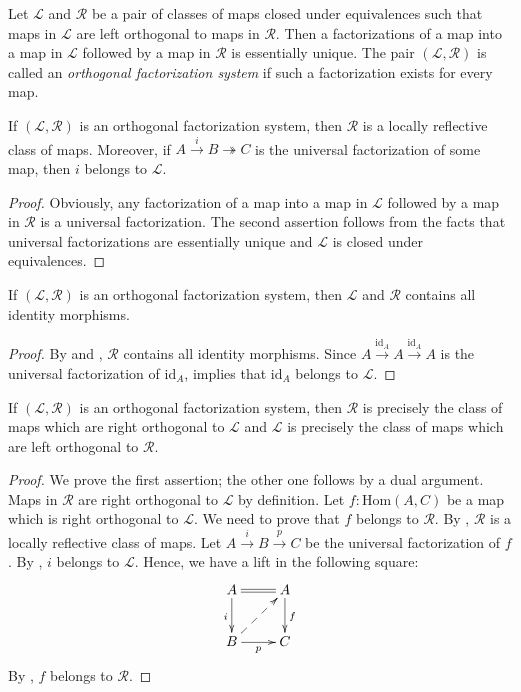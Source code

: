\documentclass[reqno]{amsart}
\theoremstyle{definition}
\theoremstyle{remark}
\newcommand{\fs}[1]{\mathrm{#1}}
\newcommand{\Hom}{\fs{Hom}}
\newcommand{\id}{\fs{id}}
\numberwithin{figure}{section}
\begin{document}
Let $\mathcal{L}$ and $\mathcal{R}$ be a pair of classes of maps closed under equivalences such that maps in $\mathcal{L}$ are left orthogonal to maps in $\mathcal{R}$.
Then a factorizations of a map into a map in $\mathcal{L}$ followed by a map in $\mathcal{R}$ is essentially unique.
The pair $(\mathcal{L},\mathcal{R})$ is called an \emph{orthogonal factorization system} if such a factorization exists for every map.

\begin{lem}
If $(\mathcal{L},\mathcal{R})$ is an orthogonal factorization system, then $\mathcal{R}$ is a locally reflective class of maps.
Moreover, if $A \xrightarrow{i} B \twoheadrightarrow C$ is the universal factorization of some map, then $i$ belongs to $\mathcal{L}$.
\end{lem}
\begin{proof}
Obviously, any factorization of a map into a map in $\mathcal{L}$ followed by a map in $\mathcal{R}$ is a universal factorization.
The second assertion follows from the facts that universal factorizations are essentially unique and $\mathcal{L}$ is closed under equivalences.
\end{proof}

\begin{prop}
If $(\mathcal{L},\mathcal{R})$ is an orthogonal factorization system, then $\mathcal{L}$ and $\mathcal{R}$ contains all identity morphisms.
\end{prop}
\begin{proof}
By  and , $\mathcal{R}$ contains all identity morphisms.
Since $A \xrightarrow{\id_A} A \xrightarrow{\id_A} A$ is the universal factorization of $\id_A$,  implies that $\id_A$ belongs to $\mathcal{L}$.
\end{proof}

\begin{prop}
If $(\mathcal{L},\mathcal{R})$ is an orthogonal factorization system, then
$\mathcal{R}$ is precisely the class of maps which are right orthogonal to $\mathcal{L}$ and
$\mathcal{L}$ is precisely the class of maps which are left orthogonal to $\mathcal{R}$.
\end{prop}
\begin{proof}
We prove the first assertion; the other one follows by a dual argument.
Maps in $\mathcal{R}$ are right orthogonal to $\mathcal{L}$ by definition.
Let $f : \Hom(A,C)$ be a map which is right orthogonal to $\mathcal{L}$.
We need to prove that $f$ belongs to $\mathcal{R}$.
By , $\mathcal{R}$ is a locally reflective class of maps.
Let $A \xrightarrow{i} B \xrightarrow{p} C$ be the universal factorization of $f$.
By , $i$ belongs to $\mathcal{L}$.
Hence, we have a lift in the following square:
\[ \xymatrix{ A \ar@{=}[r] \ar[d]_i     & A \ar[d]^f \\
              B \ar[r]_p \ar@{-->}[ur]  & C
            } \]
By , $f$ belongs to $\mathcal{R}$.
\end{proof}
\end{document}
